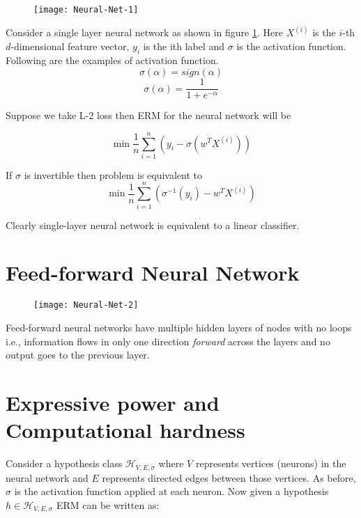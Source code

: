 \documentclass[12pt]{report}
\begin{document}
\begin{figure}[H]
\centering
\texttt{[image: Neural-Net-1]}
\caption{}
\label{fig:Neural-Net-1}
\end{figure}


Consider a single layer neural network as shown in figure \ref{fig:Neural-Net-1}. Here $X^{(i)}$ is the $i$-th $d$-dimensional feature vector, $y_{i}$ is the ith label and $\sigma$ is the activation function. Following are the examples of activation function.
$$\sigma(\alpha) = sign(\alpha)$$
$$\sigma(\alpha) = \frac{1}{1 + e^{-\alpha}}$$

Suppose we take L-2 loss then ERM for the neural network will be

$$\min \frac{1}{n} \sum^{n}_{i = 1} (y_{i} - \sigma(w^TX^{(i)}))$$

If $\sigma$ is invertible then problem is equivalent to
$$\min \frac{1}{n} \sum^{n}_{i = 1} (\sigma^{-1}(y_{i}) - w^TX^{(i)})$$

Clearly single-layer neural network is equivalent to a linear classifier.

%
%


\section{Feed-forward Neural Network}
\begin{figure}[H]
\centering
\texttt{[image: Neural-Net-2]}
\caption{}
\label{fig:Neural-Net-2}
\end{figure}

Feed-forward neural networks have multiple hidden layers of nodes with no loops i.e., information flows in only one direction \textit{forward} across the layers and no output goes to the previous layer.

\section{Expressive power and Computational hardness}
Consider a hypothesis class $\mathcal{H}_{V,E,\sigma}$ where $V$ represents vertices (neurons) in the neural network and $E$ represents directed edges between those vertices. As before, $\sigma$ is the activation function applied at each neuron. Now given a hypothesis $h \in \mathcal{H}_{V,E,\sigma}$ ERM can be written as:
\end{document}
